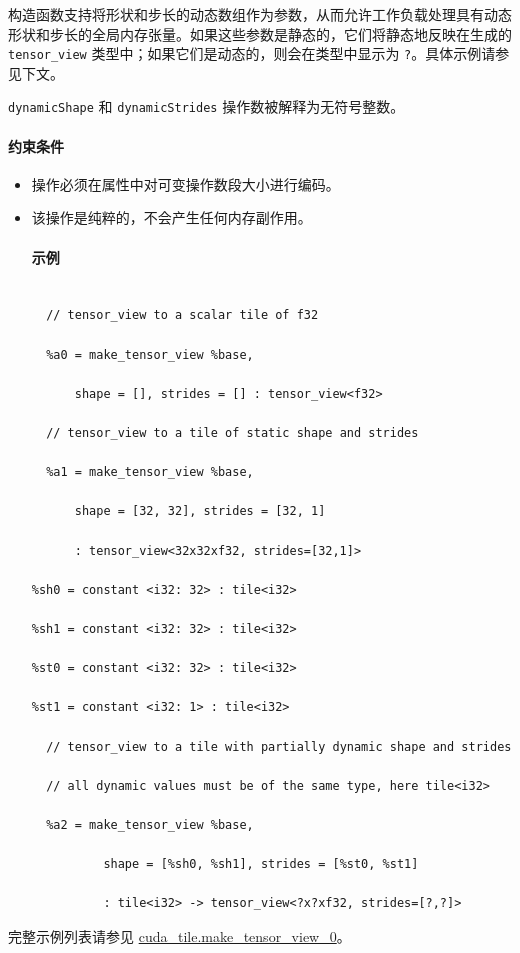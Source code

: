 \documentclass{article}
\begin{document}
构造函数支持将形状和步长的动态数组作为参数，从而允许工作负载处理具有动态形状和步长的全局内存张量。如果这些参数是静态的，它们将静态地反映在生成的 \texttt{tensor\_view} 类型中；如果它们是动态的，则会在类型中显示为 \texttt{?}。具体示例请参见下文。



\texttt{dynamicShape} 和 \texttt{dynamicStrides} 操作数被解释为无符号整数。





\paragraph{约束条件}


\begin{itemize}
\item 操作必须在属性中对可变操作数段大小进行编码。
\item 该操作是纯粹的，不会产生任何内存副作用。




\paragraph{示例}


\begin{lstlisting}

  // tensor_view to a scalar tile of f32

  %a0 = make_tensor_view %base,

      shape = [], strides = [] : tensor_view<f32>

  // tensor_view to a tile of static shape and strides

  %a1 = make_tensor_view %base,

      shape = [32, 32], strides = [32, 1]

      : tensor_view<32x32xf32, strides=[32,1]>

%sh0 = constant <i32: 32> : tile<i32>

%sh1 = constant <i32: 32> : tile<i32>

%st0 = constant <i32: 32> : tile<i32>

%st1 = constant <i32: 1> : tile<i32>

  // tensor_view to a tile with partially dynamic shape and strides

  // all dynamic values must be of the same type, here tile<i32>

  %a2 = make_tensor_view %base,

          shape = [%sh0, %sh1], strides = [%st0, %st1]

          : tile<i32> -> tensor_view<?x?xf32, strides=[?,?]>

\end{lstlisting}



\end{itemize}
完整示例列表请参见 \href{https://docs.nvidia.com/cuda/tile-ir/latest/sections/appendix.html#example-cuda-tile-make-tensor-view-0}{cuda\_tile.make\_tensor\_view\_0}。
\end{document}
